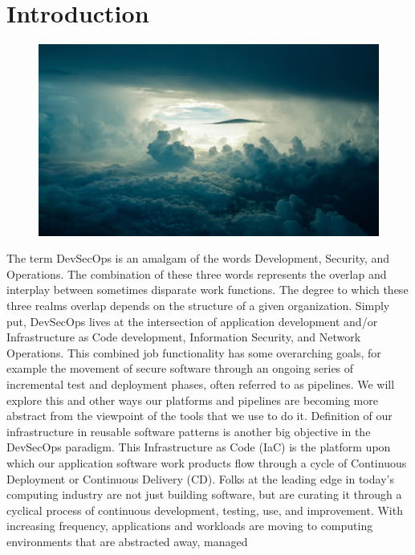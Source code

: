 \chapter{Introduction}
\begin{figure}[!htb]
\includegraphics{../images/sky-690293_1920.jpg}
\end{figure}
\justify{}
The term DevSecOps is an amalgam of the words
Development, Security, and Operations. The combination of
these three words represents the overlap and interplay between
sometimes disparate work functions. The degree to which these three 
realms overlap depends on the structure of a given organization.
Simply put, DevSecOps lives at the intersection of
application development and/or Infrastructure as Code
development, Information Security, and Network Operations.
\justify{}
This combined job functionality has some overarching goals, for
example the movement of secure
software through an ongoing series of incremental test and deployment
phases, often referred to as pipelines. We will explore this and other
ways our platforms and pipelines
are becoming more abstract from the viewpoint of the tools that we use to do it.
Definition of our infrastructure in reusable software patterns is another big objective
in the DevSecOps paradigm. This Infrastructure as Code (IaC)
is the platform
upon which our application software work products flow through a cycle of Continuous
Deployment or Continuous Delivery (CD).
\justify{}
Folks at the leading edge in today's computing industry are not just building
software, but are curating it through a cyclical process of continuous development,
testing, use, and improvement. With increasing frequency, applications and
workloads are moving to computing environments that are abstracted away, managed
